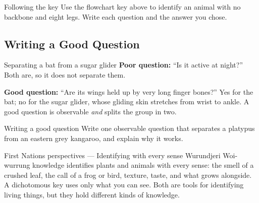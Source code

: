 \begin{wedo}{Following the key}
Use the flowchart key above to identify an animal with no backbone and eight legs. Write each question and the answer you chose.
\answerbox{4cm}
\end{wedo}

\subsection{Writing a Good Question}\label{sub:4.2}

\begin{workedex}{Separating a bat from a sugar glider}
\textbf{Poor question:} ``Is it active at night?'' Both are, so it does not separate them.

\smallskip
\textbf{Good question:} ``Are its wings held up by very long finger bones?'' Yes for the bat; no for the sugar glider, whose gliding skin stretches from wrist to ankle. A good question is observable \emph{and} splits the group in two.
\end{workedex}

\begin{wedo}{Writing a good question}
Write one observable question that separates a platypus from an eastern grey kangaroo, and explain why it works.
\answerbox{4cm}
\end{wedo}

\begin{countrybox}{First Nations perspectives --- Identifying with every sense}
Wurundjeri Woi-wurrung knowledge identifies plants and animals with every sense: the smell of a crushed leaf, the call of a frog or bird, texture, taste, and what grows alongside. A dichotomous key uses only what you can see. Both are tools for identifying living things, but they hold different kinds of knowledge.
\end{countrybox}

\label{prac:4}

